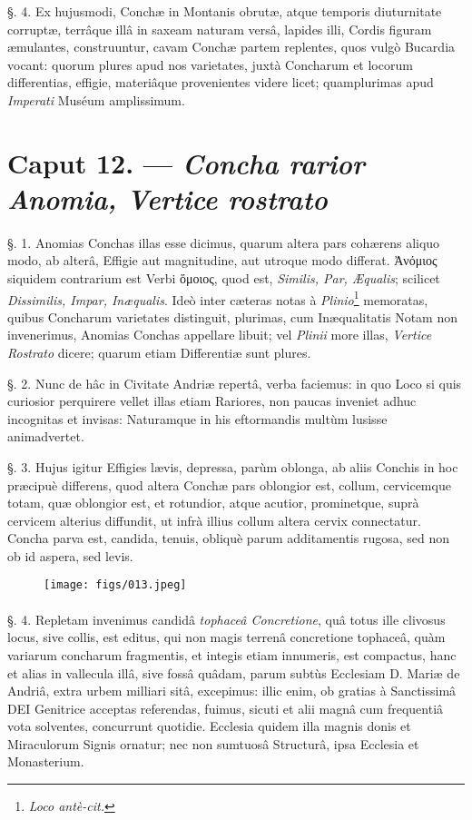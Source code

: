 \documentclass[a4paper, 11pt, oneside, polutonikogreek, german]{article}
\begin{document}
§. 4. Ex hujusmodi, Conchæ in Montanis obrutæ, atque temporis diuturnitate corruptæ, terrâque illâ in saxeam naturam versâ, lapides illi, Cordis figuram æmulantes, construuntur, cavam Conchæ partem replentes, quos vulgò Bucardia vocant: quorum plures apud nos varietates, juxtà Concharum et locorum differentias, effigie, materiâque provenientes videre licet; quamplurimas apud \emph{Imperati} Muséum amplissimum.

\section{Caput 12. --- \emph{Concha rarior Anomia, Vertice rostrato}}
\paragraph{}
§. 1. Anomias Conchas illas esse dicimus, quarum altera pars cohærens aliquo modo, ab alterâ, Effigie aut magnitudine, aut utroque modo differat. Ἀνόμιος siquidem contrarium est Verbi ὅμοιος, quod est, \emph{Similis, Par, Æqualis}; scilicet \emph{Dissimilis, Impar, Inæqualis}. Ideò inter cæteras notas à \emph{Plinio}\footnote{\emph{Loco antè-cit.}} memoratas, quibus Concharum varietates distinguit, plurimas, cum Inæqualitatis Notam non invenerimus, Anomias Conchas appellare libuit; vel \emph{Plinii} more illas, \emph{Vertice Rostrato} dicere; quarum etiam Differentiæ sunt plures.

§. 2. Nunc de hâc in Civitate Andriæ repertâ, verba faciemus: in quo Loco si quis curiosior perquirere vellet illas etiam Rariores, non paucas inveniet adhuc incognitas et invisas: Naturamque in his eftormandis multùm lusisse animadvertet.

§. 3. Hujus igitur Effigies lævis, depressa, parùm oblonga, ab aliis Conchis in hoc præcipuè differens, quod altera Conchæ pars oblongior est, collum, cervicemque totam, quæ oblongior est, et rotundior, atque acutior, prominetque, suprà cervicem alterius diffundit, ut infrà illius collum altera cervix connectatur. Concha parva est, candida, tenuis, obliquè parum additamentis rugosa, sed non ob id aspera, sed levis.

\begin{figure}[H]
\centering
\texttt{[image: figs/013.jpeg]}

\end{figure}
\paragraph{}
§. 4. Repletam invenimus candidâ \emph{tophaceâ Concretione}, quâ totus ille clivosus locus, sive collis, est editus, qui non magis terrenâ concretione tophaceâ, quàm variarum concharum fragmentis, et integis etiam innumeris, est compactus, hanc et alias in vallecula illâ, sive fossâ quâdam, parum subtùs Ecclesiam D. Mariæ de Andriâ, extra urbem milliari sitâ, excepimus: illic enim, ob gratias à Sanctissimâ DEI Genitrice acceptas referendas, fuimus, sicuti et alii magnâ cum frequentiâ vota solventes, concurrunt quotidie. Ecclesia quidem illa magnis donis et Miraculorum Signis ornatur; nec non sumtuosâ Structurâ, ipsa Ecclesia et Monasterium.
\end{document}
